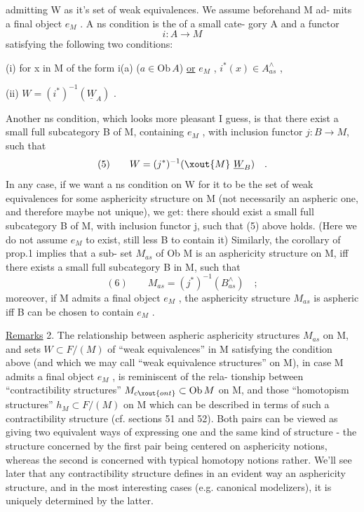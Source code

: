 
admitting W as it's set of weak equivalences.  We assume beforehand M ad-%
mits a final object $e_M$ .  A ns condition is the  of a small cate-%
gory A and a functor
\[ i: A \longrightarrow M \]
satisfying the following two conditions:

(i) for x in M of the form i(a) ($a \in \mathrm{Ob}\, A$) \uline{or} $e_M$ , $i^{*}(x) \in A^{\wedge}_{as}$ ,

(ii) $W = (i^{*})^{-1}(\underline{W}_A)$ .

Another ns condition, which looks more pleasant I guess, is that there
exist a small full subcategory B of M, containing $e_M$ , with inclusion
functor $j: B \to M$, such that
\[ (5) \qquad W = (j^{*})^{-1}(\xout{M}\ \underline{W}_B) \quad . \]
In any case, if we want a ns condition on W for it to be the set of
weak equivalences for some asphericity structure on M (not necessarily
an aspheric one, and therefore maybe not unique), we get: there should
exist a small full subcategory B of M, with inclusion functor j, such
that (5) above holds. (Here we do not assume $e_M$ to exist, still less B
to contain it) Similarly, the corollary of prop.1 implies that a sub-%
set $M_{as}$ of Ob M is an asphericity structure on M, iff there exists a
small full subcategory B in M, such that
\[ (6) \qquad M_{as} = (j^{*})^{-1}(B^{\wedge}_{as}) \quad ; \]
moreover, if M admits a final object $e_M$ , the asphericity structure $M_{as}$
is aspheric iff B can be chosen to contain $e_M$ .

\uline{Remarks} 2.  The relationship between aspheric asphericity structures
$M_{as}$ on M, and sets $W \subset F\!\!/(M)$ of ``weak equivalences'' in M \xout{(}satisfying
the condition above (and which we may call ``weak equivalence structures''
on M), in case M admits a final object $e_M$ , is reminiscent of the rela-%
tionship between  ``contractibility structures'' $M_{c\xout{ont}} \subset \mathrm{Ob}\, M$ on M,
and those ``homotopism structures''  $h_M \subset F\!\!/(M)$ on M which can be
described in terms of such a contractibility structure (cf. sections 51
and 52). Both pairs can be viewed as giving two equivalent ways of
expressing one and the same kind of structure - the structure concerned
by the first pair being centered on asphericity notions, whereas the
second is concerned with typical homotopy notions rather. We'll see
later that any contractibility structure defines in an evident way an
 asphericity structure, and in the most interesting cases (e.g. canonical
 modelizers), it is uniquely determined by the latter.

